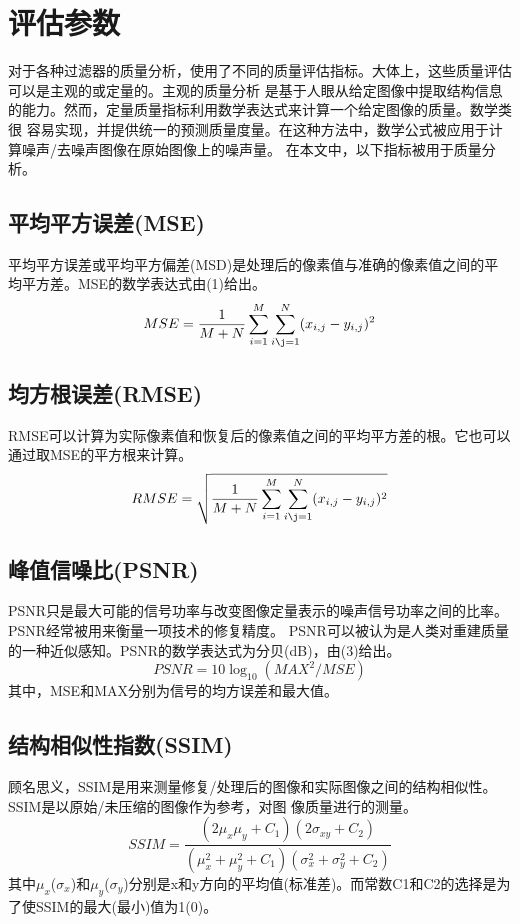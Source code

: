 \documentclass{article} %
\begin{document}
\section{评估参数}
对于各种过滤器的质量分析，使用了不同的质量评估指标。大体上，这些质量评估可以是主观的或定量的。主观的质量分析
是基于人眼从给定图像中提取结构信息的能力。然而，定量质量指标利用数学表达式来计算一个给定图像的质量。数学类很
容易实现，并提供统一的预测质量度量。在这种方法中，数学公式被应用于计算噪声/去噪声图像在原始图像上的噪声量。
在本文中，以下指标被用于质量分析。

\subsection{平均平方误差(MSE)}
平均平方误差或平均平方偏差(MSD)是处理后的像素值与准确的像素值之间的平均平方差。MSE的数学表达式由(1)给出。
\begin{equation}
    MSE= \frac{1}{M+N}\sum_{i=1}^M\sum_{i\j=1}^N(x_{i,j}-y_{i,j})^2
\end{equation}

\subsection{均方根误差(RMSE)}
RMSE可以计算为实际像素值和恢复后的像素值之间的平均平方差的根。它也可以通过取MSE的平方根来计算。
\begin{equation}
    RMSE=\sqrt{\frac{1}{M+N}\sum_{i=1}^M\sum_{i\j=1}^N(x_{i,j}-y_{i,j})^2}
\end{equation}

\subsection{峰值信噪比(PSNR)}
PSNR只是最大可能的信号功率与改变图像定量表示的噪声信号功率之间的比率。PSNR经常被用来衡量一项技术的修复精度。
PSNR可以被认为是人类对重建质量的一种近似感知。PSNR的数学表达式为分贝(dB)，由(3)给出。
\begin{equation}
    PSNR=10\log_{10}({MAX^2}/{MSE})
\end{equation}
其中，MSE和MAX分别为信号的均方误差和最大值。

\subsection{结构相似性指数(SSIM)}
顾名思义，SSIM是用来测量修复/处理后的图像和实际图像之间的结构相似性。SSIM是以原始/未压缩的图像作为参考，对图
像质量进行的测量。
\begin{equation}
    SSIM=\frac{(2\mu_x\mu_y+C_1)(2\sigma_{xy}+C_2)}{(\mu_x^2+\mu_y^2+C_1)(\sigma_x^2+\sigma_y^2+C_2)}
\end{equation}
其中$\mu_x$($\sigma_x$)和$\mu_y$($\sigma_y$)分别是x和y方向的平均值(标准差)。而常数C1和C2的选择是为了使SSIM的最大(最小)值为1(0)。
\end{document}
